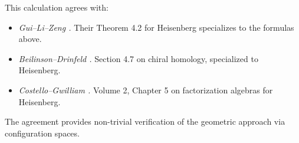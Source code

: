 \begin{remark}\label{rem:heisenberg-literature}
This calculation agrees with:
\begin{itemize}
\item \emph{Gui--Li--Zeng \cite{GLZ22}.} Their Theorem 4.2 for Heisenberg specializes to the formulas above.
\item \emph{Beilinson--Drinfeld \cite{BD04}.} Section 4.7 on chiral homology, specialized to Heisenberg.
\item \emph{Costello--Gwilliam \cite{CG17}.} Volume 2, Chapter 5 on factorization algebras for Heisenberg.
\end{itemize}

The agreement provides non-trivial verification of the geometric approach via configuration spaces.
\end{remark}

